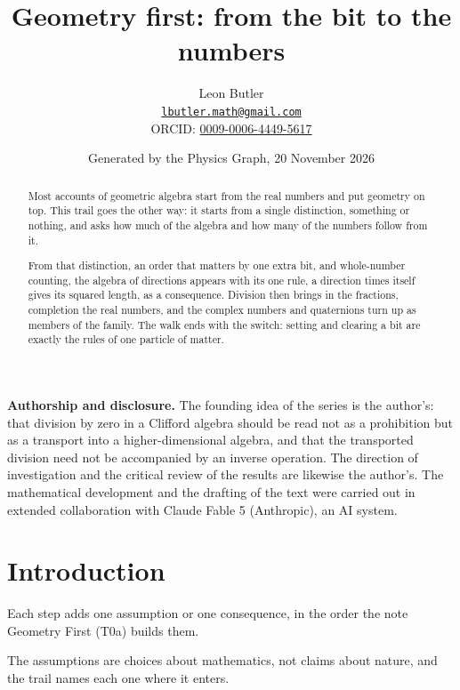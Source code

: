\documentclass[11pt]{article}
\title{\bfseries Geometry first: from the bit to the numbers}
\author{Leon Butler\\ \normalsize\href{mailto:lbutler.math@gmail.com}{\texttt{lbutler.math@gmail.com}}\\ \normalsize ORCID: \href{https://orcid.org/0009-0006-4449-5617}{0009-0006-4449-5617}}
\date{Generated by the Physics Graph, 20 November 2026}
\theoremstyle{definition}
\theoremstyle{plain}
\begin{document}
\maketitle
\begin{abstract}
\normalsize
Most accounts of geometric algebra start from the real numbers and put geometry on top. This trail goes the other way: it starts from a single distinction, something or nothing, and asks how much of the algebra and how many of the numbers follow from it.

From that distinction, an order that matters by one extra bit, and whole-number counting, the algebra of directions appears with its one rule, a direction times itself gives its squared length, as a consequence. Division then brings in the fractions, completion the real numbers, and the complex numbers and quaternions turn up as members of the family. The walk ends with the switch: setting and clearing a bit are exactly the rules of one particle of matter.
\end{abstract}
\newpage
\noindent \textbf{Authorship and disclosure. }The founding idea of the series is the author's: that division by zero in a Clifford algebra should be read not as a prohibition but as a transport into a higher-dimensional algebra, and that the transported division need not be accompanied by an inverse operation. The direction of investigation and the critical review of the results are likewise the author's. The mathematical development and the drafting of the text were carried out in extended collaboration with Claude Fable 5 (Anthropic), an AI system.

\noindent{}
\newpage

\section*{Introduction}
Each step adds one assumption or one consequence, in the order the note Geometry First (T0a) builds them.

The assumptions are choices about mathematics, not claims about nature, and the trail names each one where it enters.
\end{document}

